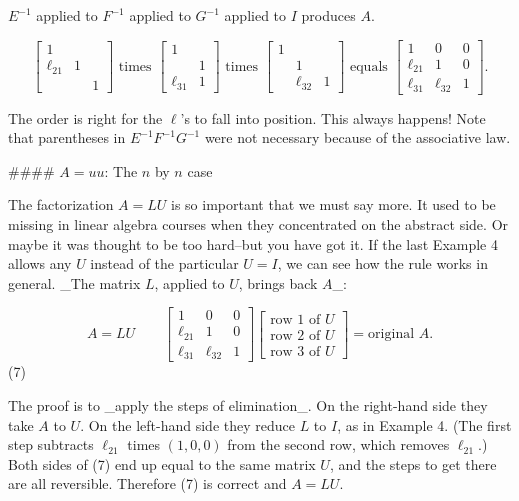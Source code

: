 \(E^{-1}\) applied to \(F^{-1}\) applied to \(G^{-1}\) applied to \(I\) produces \(A\).

\[\begin{bmatrix}1&\\ \ell_{21}&1\\ &&1\end{bmatrix}\text{ times }\begin{bmatrix}1&\\ &1\\ \ell_{31}&1\end{bmatrix}\text{ times }\begin{bmatrix}1&\\ &1\\ &\ell_{32}&1\end{bmatrix}\text{ equals }\begin{bmatrix}1&0&0\\ \ell_{21}&1&0\\ \ell_{31}&\ell_{32}&1\end{bmatrix}.\]

The order is right for the \(\ell\)'s to fall into position. This always happens! Note that parentheses in \(E^{-1}F^{-1}G^{-1}\) were not necessary because of the associative law.

#### \(A=uu\): The \(n\) by \(n\) case

The factorization \(A=LU\) is so important that we must say more. It used to be missing in linear algebra courses when they concentrated on the abstract side. Or maybe it was thought to be too hard--but you have got it. If the last Example 4 allows any \(U\) instead of the particular \(U=I\), we can see how the rule works in general. _The matrix \(L\), applied to \(U\), brings back \(A\)_:

\[A=LU\qquad\begin{bmatrix}1&0&0\\ \ell_{21}&1&0\\ \ell_{31}&\ell_{32}&1\end{bmatrix}\begin{bmatrix}\text{row 1 of }U\\ \text{row 2 of }U\\ \text{row 3 of }U\end{bmatrix}=\text{original }A.\] (7)

The proof is to _apply the steps of elimination_. On the right-hand side they take \(A\) to \(U\). On the left-hand side they reduce \(L\) to \(I\), as in Example 4. (The first step subtracts \(\ell_{21}\) times \((1,0,0)\) from the second row, which removes \(\ell_{21}\).) Both sides of (7) end up equal to the same matrix \(U\), and the steps to get there are all reversible. Therefore (7) is correct and \(A=LU\).

